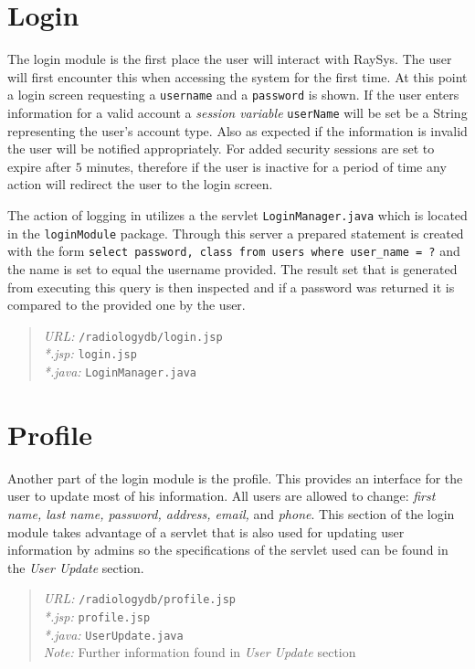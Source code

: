 \documentclass[12pt]{report}
\begin{document}
\section*{Login}

The login module is the first place the user will interact with RaySys. The user will first encounter this when accessing the system for the first time. At this point a login screen requesting a \texttt{username} and a \texttt{password} is shown. If the user enters information for a valid account a \emph{session variable} \texttt{userName} will be set be a String representing the user's account type. Also as expected if the information is invalid the user will be notified appropriately. For added security sessions are set to expire after $5$ minutes, therefore if the user is inactive for a period of time any action will redirect the user to the login screen.

The action of logging in utilizes a the servlet \texttt{LoginManager.java} which is located in the \texttt{loginModule} package. Through this server a prepared statement is created with the form \texttt{select password, class from users where user\_name = ?} and the name is set to equal the username provided. The result set that is generated from executing this query is then inspected and if a password was returned it is compared to the provided one by the user.

\begin{quote}
\emph{URL:} \texttt{/radiologydb/login.jsp} \\
\emph{*.jsp: } \texttt{login.jsp} \\
\emph{*.java: } \texttt{LoginManager.java}
\end{quote}

\section*{Profile}
Another part of the login module is the profile. This provides an interface for the user to update most of his information. All users are allowed to change: \emph{first name, last name, password, address, email,} and \emph{ phone}. This section of the login module takes advantage of a servlet that is also used for updating user information by admins so the specifications of the servlet used can be found in the \emph{User Update} section.

\begin{quote}
\emph{URL:} \texttt{/radiologydb/profile.jsp} \\
\emph{*.jsp: } \texttt{profile.jsp} \\
\emph{*.java: } \texttt{UserUpdate.java}\\
\emph{Note:} Further information found in \emph{User Update} section
\end{quote}
\end{document}
